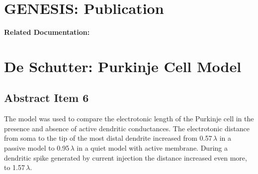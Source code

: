 \documentclass[12pt]{article}
\begin{document}
\section*{GENESIS: Publication}

{\bf Related Documentation:}

\section*{De Schutter: Purkinje Cell Model}

\subsection*{Abstract Item 6}

The model was used to compare the electrotonic length of
the Purkinje cell in the presence and absence of active dendritic
conductances. The electrotonic distance from soma to the tip of
the most distal dendrite increased from 0.57\,$\lambda$ in a passive model
to 0.95\,$\lambda$ in a quiet model with active membrane. During a dendritic
spike generated by current injection the distance increased
even more, to 1.57\,$\lambda$.
\end{document}
